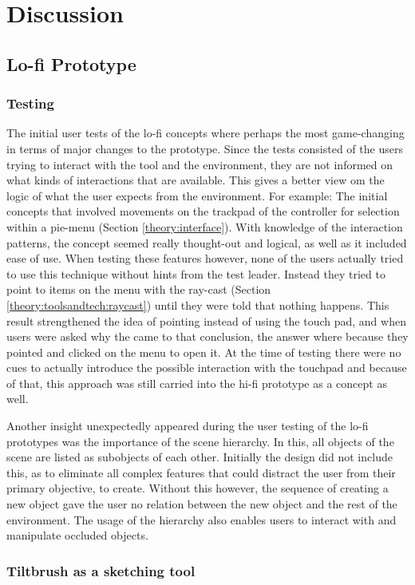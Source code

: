 
\chapter{Discussion}
\section{Lo-fi Prototype}
\subsection{Testing}
The initial user tests of the lo-fi concepts where perhaps the most game-changing in terms of major changes to the prototype. Since the tests consisted of the users trying to interact with the tool and the environment, they are not informed on what kinds of interactions that are available. This gives a better view om the logic of what the user expects from the environment. For example: The initial concepts that involved movements on the trackpad of the controller for selection within a pie-menu (Section \ref{theory:interface}). With knowledge of the interaction patterns, the concept seemed really thought-out and logical, as well as it included ease of use. When testing these features however, none of the users actually tried to use this technique without hints from the test leader. Instead they tried to point to items on the menu with the ray-cast (Section \ref{theory:toolsandtech:raycast}) until they were told that nothing happens. This result strengthened the idea of pointing instead of using the touch pad, and when users were asked why the came to that conclusion, the answer where because they pointed and clicked on the menu to open it. At the time of testing there were no cues to actually introduce the possible interaction with the touchpad and because of that, this approach was still carried into the hi-fi prototype as a concept as well.

Another insight unexpectedly appeared during the user testing of the lo-fi prototypes was the importance of the scene hierarchy. In this, all objects of the scene are listed as subobjects of each other. Initially the design did not include this, as to eliminate all complex features that could distract the user from their primary objective, to create. Without this however, the sequence of creating a new object gave the user no relation between the new object and the rest of the environment. The usage of the hierarchy also enables users to interact with and manipulate occluded objects.

\subsection{Tiltbrush as a sketching tool}

